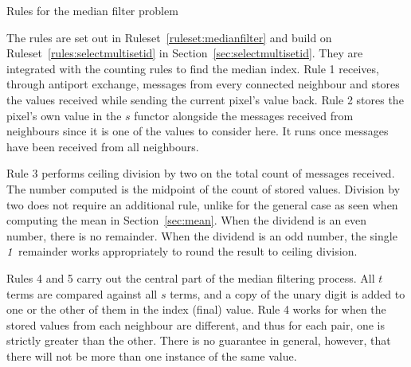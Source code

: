 \begin{cprulesetfloat}[t]
\begin{cpruleset}
%
%
%
%

%
\end{cpruleset}
\caption{\label{ruleset:medianfilter}Rules for the median filter problem}
\end{cprulesetfloat}

The rules are set out in Ruleset~\ref{ruleset:medianfilter} and build on Ruleset~\ref{rules:selectmultisetid} in Section~\ref{sec:selectmultisetid}.  They are integrated with the counting rules to find the median index.   Rule 1 receives, through antiport exchange, messages from every connected neighbour and stores the values received while sending the current pixel's value back.  Rule 2 stores the pixel's own value in the \(s\) functor alongside the messages received from neighbours since it is one of the values to consider here.  It runs once messages have been received from all neighbours.

Rule 3 performs ceiling division by two on the total count of messages received.  The number computed is the midpoint of the count of stored values.  Division by two does not require an additional rule, unlike for the general case as seen when computing the mean in Section~\ref{sec:mean}.  When the dividend is an even number, there is no remainder.  When the dividend is an odd number, the single \(\mathit{1}\) remainder works appropriately to round the result to ceiling division.

Rules 4 and 5 carry out the central part of the median filtering process.  All \(t\) terms are compared against all \(s\) terms, and a copy of the unary digit is added to one or the other of them in the index (final) value.
Rule 4 works for when the stored values from each neighbour are different, and thus for each pair, one is strictly greater than the other.   There is no guarantee in general, however, that there will not be more than one instance of the same value.

